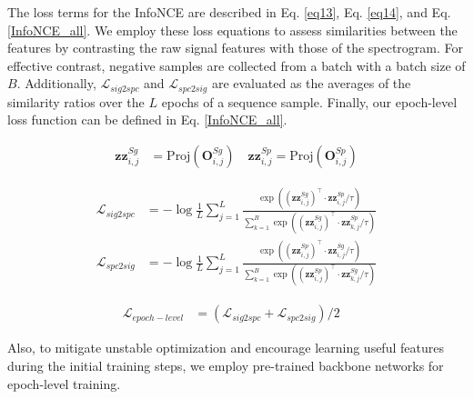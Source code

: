 The loss terms for the InfoNCE are described in Eq. \ref{eq13}, Eq. \ref{eq14}, and Eq. \ref{InfoNCE_all}. We employ these loss equations to assess similarities between the features by contrasting the raw signal features with those of the spectrogram.
For effective contrast, negative samples are collected from a batch with a batch size of $B$.
Additionally, $\mathcal{L}_{sig2spc}$ and $\mathcal{L}_{spc2sig}$ are evaluated as the averages of the similarity ratios over the $L$ epochs of a sequence sample. Finally, our epoch-level loss function can be defined in Eq. \ref{InfoNCE_all}.

\begin{align}
\label{eq12}
\mathbf{zz}^{Sg}_{i,j} &= \text{Proj}(\textbf{O}^{Sg}_{i, j}) \quad  \mathbf{zz}^{Sp}_{i,j} = \text{Proj}(\textbf{O}^{Sp}_{i, j})
\end{align}
\vspace{-15pt}

\begin{align}
\label{eq13}
\mathcal{L}_{sig2spc} &= -\log \frac{1}{L}\sum_{j=1}^{L}\frac{\exp((\mathbf{zz}^{Sg}_{i,j})^ \top \cdot \mathbf{zz}^{Sp}_{i,j} / \tau)}{\sum_{k=1}^{B} \exp((\mathbf{zz}^{Sg}_{i,j})^ \top \cdot \mathbf{zz}^{Sp}_{k, j} / \tau)} \\
\label{eq14} \mathcal{L}_{spc2sig} &= -\log \frac{1}{L} \sum_{j=1}^{L}\frac{\exp((\mathbf{zz}^{Sp}_{i,j})^ \top \cdot \mathbf{zz}^{Sg}_{i,j} / \tau)}{\sum_{k=1}^{B} \exp((\mathbf{zz}^{Sp}_{i,j})^ \top \cdot \mathbf{zz}^{Sg}_{k, j} / \tau)}
\end{align}


\vspace{-10pt}
\begin{align}
\label{InfoNCE_all}
\mathcal{L}_{epoch-level} &= (\mathcal{L}_{sig2spc} + \mathcal{L}_{spc2sig})/2 \;\;\; 
\end{align}


Also, to mitigate unstable optimization and encourage learning useful features during the initial training steps, we employ pre-trained backbone networks for epoch-level training. 


